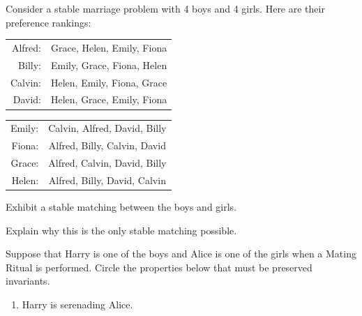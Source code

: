 \documentclass[12pt,oneside]{article}
\begin{document}
\newpage
\begin{problem}{16}
  Consider a stable marriage problem with 4 boys and 4 girls. Here
  are their preference rankings:

\begin{center}
\begin{tabular}{r|c} 
Alfred:    & Grace, Helen, Emily, Fiona    \\
Billy:     & Emily, Grace, Fiona, Helen    \\
Calvin:    & Helen, Emily, Fiona, Grace    \\
David:     & Helen, Grace, Emily, Fiona
\end{tabular}
\end{center}

\begin{center}
\begin{tabular}{r|c} 
Emily:     & Calvin, Alfred, David,  Billy    \\
Fiona:     & Alfred, Billy,  Calvin, David    \\
Grace:     & Alfred, Calvin, David,  Billy    \\
Helen:     & Alfred, Billy,  David,  Calvin
\end{tabular}
\end{center}

\bparts

Exhibit a stable matching between the boys and girls.


 Explain why this is the only stable matching possible.


 Suppose that Harry is one of the boys and Alice is one of the girls
when a Mating Ritual is performed.  Circle the properties
below that must be preserved invariants.
\renewcommand{\theenumi}{\roman{enumi}}
\renewcommand{\labelenumi}{(\theenumi)}

\begin{enumerate}

\item Harry is serenading Alice.


\end{enumerate}
\end{problem}
\end{document}
